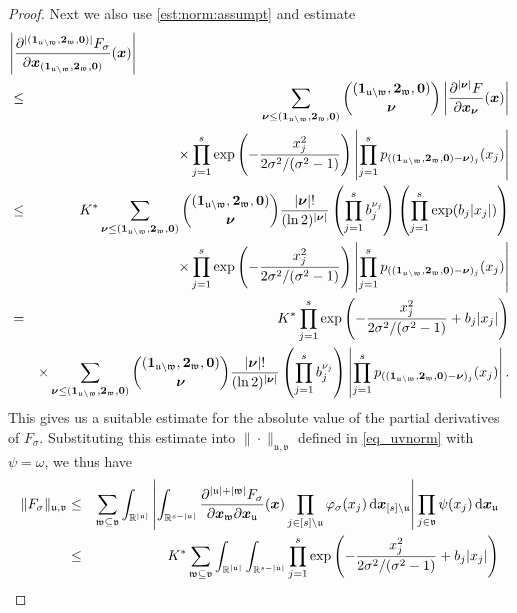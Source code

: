 \documentclass[namedate,webpdf,imanum]{ima-authoring-arxiv}%
\theoremstyle{thmstyletwo}%
\numberwithin{equation}{section}
\newcommand{\rd}{\, {\rm d}}
\newcommand{\bsx}{\boldsymbol{x}}
\newcommand{\bsnu}{\boldsymbol{\nu}}
\newcommand{\bszero}{\boldsymbol{0}}
\newcommand{\bsone}{\boldsymbol{1}}
\newcommand{\bstwo}{\boldsymbol{2}}
\newcommand{\uu}{\mathfrak{u}}
\newcommand{\vv}{\mathfrak{v}}
\newcommand{\ww}{\mathfrak{w}}
\begin{document}
\begin{proof}
Next we also use \eqref{est:norm:assumpt} and estimate
\begin{eqnarray*}
\lefteqn{\left|\frac{\partial^{|(\bsone_{\uu \setminus \ww},\bstwo_{\ww},\bszero)|}F_{\sigma}}{\partial \bsx_{(\bsone_{\uu \setminus \ww},\bstwo_{\ww},\bszero)}} (\bsx)\right| }\\
& \le &  \sum_{\bsnu \le (\bsone_{\uu \setminus \ww},\bstwo_{\ww},\bszero)} {(\bsone_{\uu \setminus \ww},\bstwo_{\ww},\bszero) \choose \bsnu} \left|\frac{\partial^{|\bsnu|}F}{\partial \bsx_{\bsnu}}(\bsx)\right|  \\
& & \times \prod_{j = 1}^s \exp\left(-\frac{x_j^2}{2 \sigma^2/(\sigma^2-1)}\right) \left| \prod_{j=1}^s p_{((\bsone_{\uu \setminus \ww},\bstwo_{\ww},\bszero) -\bsnu)_j}(x_j)\right|\\
 & \le & K^{\ast} \sum_{\bsnu \le (\bsone_{\uu \setminus \ww},\bstwo_{\ww},\bszero)} {(\bsone_{\uu \setminus \ww},\bstwo_{\ww},\bszero) \choose \bsnu} \frac{|\bsnu|!}{(\ln 2)^{|\bsnu|}} \left(\prod_{j=1}^s b_j^{\nu_j}\right) \left(\prod_{j=1}^s \exp(b_j|x_j|)\right)\\
& & \times \prod_{j = 1}^s \exp\left(-\frac{x_j^2}{2 \sigma^2/(\sigma^2-1)}\right) \left| \prod_{j=1}^s p_{((\bsone_{\uu \setminus \ww},\bstwo_{\ww},\bszero) -\bsnu)_j}(x_j)\right|\\
 & = & K^{\ast} \prod_{j = 1}^s \exp\left(-\frac{x_j^2}{2 \sigma^2/(\sigma^2-1)} +b_j|x_j|\right) \\
 && \times \sum_{\bsnu \le (\bsone_{\uu \setminus \ww},\bstwo_{\ww},\bszero)} {(\bsone_{\uu \setminus \ww},\bstwo_{\ww},\bszero) \choose \bsnu} \frac{|\bsnu|!}{(\ln 2)^{|\bsnu|}} \left(\prod_{j=1}^s b_j^{\nu_j}\right)  \left| \prod_{j=1}^s p_{((\bsone_{\uu \setminus \ww},\bstwo_{\ww},\bszero) -\bsnu)_j}(x_j)\right|.
\end{eqnarray*}
This gives us a suitable estimate for the absolute value of the partial derivatives of $F_\sigma$. Substituting this estimate into $\|\cdot\|_{\uu, \vv}$ defined in \eqref{eq_uvnorm} with $\psi=\omega$, we thus have
\begin{eqnarray*}
\|F_{\sigma} \|_{\uu, \vv} & \le & \sum_{\ww \subseteq \vv} \int_{\mathbb{R}^{|\uu|}} \left| \int_{\mathbb{R}^{s-|\uu|}} \frac{\partial^{|\uu| + |\ww|} F_{\sigma}}{\partial \bsx_\ww \partial \bsx_{\uu}}(\bsx)\prod_{j \in [s]\setminus \uu} \varphi_{\sigma}(x_j) \rd \bsx_{[s] \setminus \uu} \right|   \prod_{j \in \vv} \psi(x_j)     \rd \bsx_{\uu}\\
& \le & K^{\ast} \sum_{\ww \subseteq \vv} \int_{\mathbb{R}^{|\uu|}}  \int_{\mathbb{R}^{s-|\uu|}} \prod_{j = 1}^s \exp\left(-\frac{x_j^2}{2 \sigma^2/(\sigma^2-1)} +b_j|x_j|\right)\\

\end{eqnarray*}
\end{proof}
\end{document}
